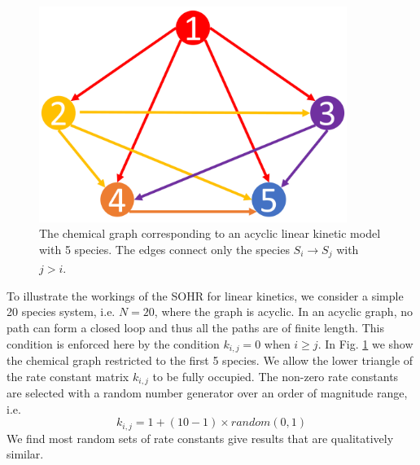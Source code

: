 \paragraph{}
\begin{figure}[htbp]
	\caption[Chemical graph corresponding to an acyclic linear kinetic model]{The chemical graph corresponding to an acyclic linear kinetic model with 5 species.
The edges connect only the species $S_i \xrightarrow[]{} S_j$ with $j > i$.}
    \begin{center}
	\includegraphics[width=100mm]{figs/chapter2dot5/fig2.png}
    \end{center}
\label{ch2dot5:fig2}
\end{figure}
To illustrate the workings of the SOHR for linear kinetics, we consider a simple 20
species system, i.e. $N = 20$, where the graph is acyclic. In an acyclic graph, no path
can form a closed loop and thus all the paths are of finite length. This condition is
enforced here by the condition $k_{i,j} = 0$ when $i \geq j$. In Fig. \ref{ch2dot5:fig2} we show the chemical
graph restricted to the first 5 species. We allow the lower triangle of the rate constant
matrix $k_{i,j}$ to be fully occupied. The non-zero rate constants are selected with a random
number generator over an order of magnitude range, i.e.
\begin{equation*}
k_{i,j} = 1 + \left( 10 - 1\right) \times random \left(0,1 \right)
\end{equation*}
We find most random sets of rate constants give results that are qualitatively similar.
